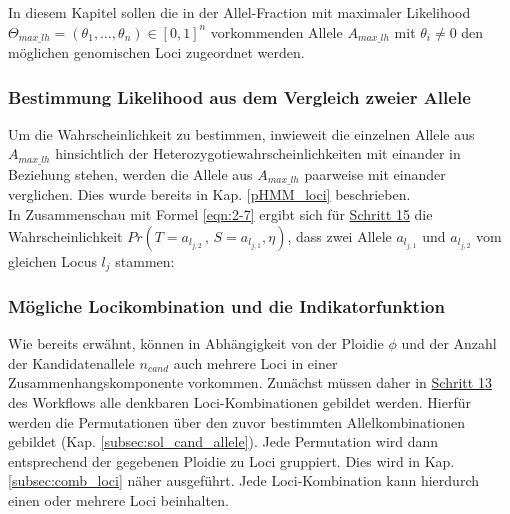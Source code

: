 In diesem Kapitel sollen die in der Allel-Fraction mit maximaler Likelihood $\Theta_{max\_lh} = (\theta_{1},\dots,\theta_{n}) \in [0,1]^n $ vorkommenden Allele $A_{max\_lh}$ mit $\theta_{i} \neq 0$ den möglichen genomischen Loci zugeordnet werden. \\

\subsubsection{Bestimmung Likelihood aus dem Vergleich zweier Allele} \label{sol_lh_al_al}

Um die Wahrscheinlichkeit zu bestimmen, inwieweit die einzelnen Allele aus $A_{max\_lh}$ hinsichtlich der Heterozygotiewahrscheinlichkeiten mit einander in Beziehung stehen, werden die Allele aus $A_{max\_lh}$ paarweise mit einander verglichen. Dies wurde bereits in Kap. \ref{pHMM_loci} beschrieben. \\

In Zusammenschau mit Formel \eqref{eqn:2-7} ergibt sich für \hyperref[step15]{Schritt 15} die Wahrscheinlichkeit $ Pr(T=a_{l_{j,2}} \, , \, S=a_{l_{j,1}}, \eta) $, dass zwei Allele $a_{l_{j,1}}$ und $a_{l_{j,2}}$ vom gleichen Locus $l_{j}$ stammen:
\vspace{-0.5cm}
\begin{center}
\end{center}

\subsubsection{Mögliche Locikombination und die Indikatorfunktion}

Wie bereits erwähnt, können in Abhängigkeit von der Ploidie $ \phi $ und der Anzahl der Kandidatenallele $n_{cand}$ auch mehrere Loci in einer Zusammenhangskomponente vorkommen. Zunächst müssen daher in \hyperref[step13]{Schritt 13\label{step13txt}} des Workflows alle denkbaren Loci-Kombinationen gebildet werden. Hierfür werden die Permutationen über den zuvor bestimmten Allelkombinationen gebildet (Kap. \ref{subsec:sol_cand_allele}). Jede Permutation wird dann entsprechend der gegebenen Ploidie zu Loci gruppiert. Dies wird in Kap. \ref{subsec:comb_loci} näher ausgeführt. Jede Loci-Kombination kann hierdurch einen oder mehrere Loci beinhalten.\\

